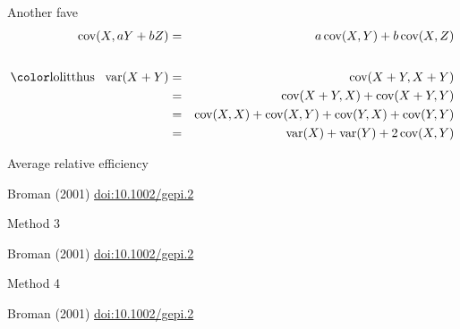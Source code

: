 \documentclass[aspectratio=169,12pt,t]{beamer}
\begin{document}
\begin{frame}[c]{Another fave}
  \begin{eqnarray*}
    \text{cov}(X, aY+bZ) & = & a \, \text{cov}(X,Y) + b \, \text{cov}(X,Z) \\[18pt]
    \text{{\lolit thus} \, var}(X+Y) & = & \text{cov}(X+Y,X+Y) \\
    & = & \text{cov}(X+Y, X) + \text{cov}(X+Y, Y) \\
    & = & \text{cov}(X, X) + \text{cov}(X, Y) + \text{cov}(Y,X) + \text{cov}(Y,Y) \\
    & = & \text{var}(X) + \text{var}(Y) + 2 \, \text{cov}(X,Y)
    \end{eqnarray*}
\end{frame}


\begin{frame}[c]{}
\end{frame}

\begin{frame}[c]{}
\end{frame}








\begin{frame}{Average relative efficiency}

\vspace{10mm}

\hfill \footnotesize {\lolit Broman (2001)
  \href{https://doi.org/10.1002/gepi.2}{doi:10.1002/gepi.2}}

\end{frame}

\begin{frame}{Method 3}

\vspace{18mm}

\hfill \footnotesize {\lolit Broman (2001)
  \href{https://doi.org/10.1002/gepi.2}{doi:10.1002/gepi.2}}

\end{frame}

\begin{frame}{Method 4}

\bigskip

\hfill \footnotesize {\lolit Broman (2001)
  \href{https://doi.org/10.1002/gepi.2}{doi:10.1002/gepi.2}}

\end{frame}
\end{document}
